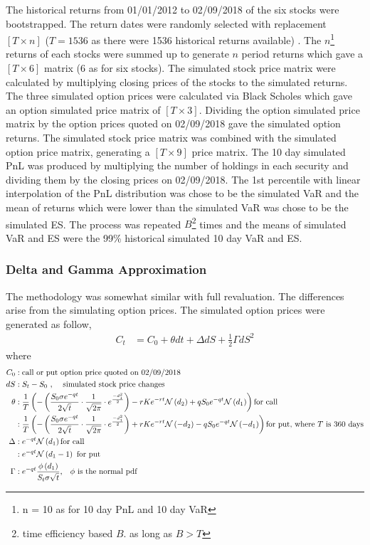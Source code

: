 \documentclass[a4paper,11pt]{article}
\begin{document}
\begin{flushleft}
\begin{itemize}
The historical returns from 01/01/2012 to 02/09/2018 of the six stocks were bootstrapped. The return dates were randomly selected with replacement $[T\times n]$ ($T=1536$ as there were 1536 historical returns available) . The $n$\footnote{n = 10 as for 10 day PnL and 10 day VaR} returns of each stocks were summed up to generate $n$ period returns which gave a $[T\times 6]$ matrix (6 as for six stocks). The simulated stock price matrix were calculated by multiplying closing prices of the stocks to the simulated returns. The three simulated option prices were calculated via Black Scholes which gave an option simulated price matrix of $[T \times 3]$. Dividing the option simulated price matrix by the option prices quoted on 02/09/2018 gave the simulated option returns. The simulated stock price matrix was combined with the simulated option price matrix, generating a $[T \times 9]$ price matrix. The 10 day simulated PnL was produced by multiplying the number of holdings in each security and dividing them by the closing prices on 02/09/2018. The 1st percentile with linear interpolation of the PnL distribution was chose to be the simulated VaR and the mean of returns which were lower than the simulated VaR was chose to be the simulated ES. The process was repeated $B$\footnote{time efficiency based $B$. as long as $B>T$} times and the means of simulated VaR and ES were the 99\%  historical simulated 10 day VaR and ES.


\subsubsection*{Delta and Gamma Approximation}

The methodology was somewhat similar with full revaluation. The differences arise from the simulating option prices. The simulated option prices were generated as follow,
\begin{align*}
C_t &= C_0 + \theta dt +  \Delta dS + \frac{1}{2} \Gamma {dS}^2
\end{align*}
where 
\begin{align*}
C_0 &: \text{call or put option price quoted on 02/09/2018}\\
dS &: S_t - S_0 \text{ , \quad simulated stock price changes}\\
\theta &: \frac{1}{T}\left(-\left(\frac{S_0 \sigma e^{-qt}}{2 \sqrt{t}}\cdot \frac{1}{\sqrt{2 \pi}}\cdot e^{\frac{-d_1^2}{2}}\right) - rKe^{-rt}\mathcal{N}\left(d_2\right) + q S_0 e^{-qt}\mathcal{N}\left(d_1 \right) \right) \text{for call}\\
&: \frac{1}{T}\left(-\left(\frac{S_0 \sigma e^{-qt}}{2 \sqrt{t}}\cdot \frac{1}{\sqrt{2 \pi}}\cdot e^{\frac{-d_1^2}{2}}\right) + rKe^{-rt}\mathcal{N}\left(-d_2\right) - q S_0 e^{-qt}\mathcal{N}\left(-d_1 \right) \right) \text{for put, where $T$ is 360 days}\\
\Delta &: e^{-qt} \mathcal{N} \left(d_1 \right) \text{for call}\\
&:  e^{-qt} \mathcal{N} \left(d_1 - 1 \right) \text{ for put}\\
\Gamma&:e^{-qt} \frac{ \phi \left(d_1\right)}{S_t \sigma \sqrt{t}} \text{,\quad $\phi$ is the normal pdf}
\end{align*}


\end{itemize}
\end{flushleft}
\end{document}
